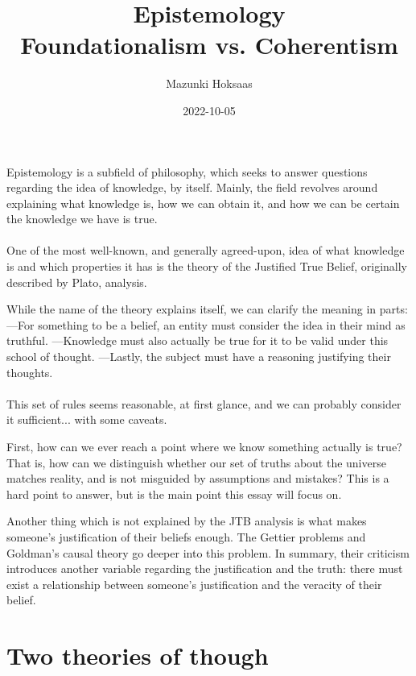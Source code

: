 \documentclass[11pt]{article}
\author{Mazunki Hoksaas}
\date{2022-10-05}
\title{Epistemology \\[1ex]\large Foundationalism vs. Coherentism}
\begin{document}
\maketitle
	\paragraph{} Epistemology is a subfield of philosophy, which seeks to answer questions regarding the idea of knowledge, by itself. Mainly, the field revolves around explaining what knowledge is, how we can obtain it, and how we can be certain the knowledge we have is true.

	\paragraph{} One of the most well-known, and generally agreed-upon, idea of what knowledge is and which properties it has is the theory of the Justified True Belief, originally described by Plato, analysis.

	While the name of the theory explains itself, we can clarify the meaning in parts: —For something to be a belief, an entity must consider the idea in their mind as truthful. —Knowledge must also actually be true for it to be valid under this school of thought. —Lastly, the subject must have a reasoning justifying their thoughts.

	\paragraph{} This set of rules seems reasonable, at first glance, and we can probably consider it sufficient... with some caveats. 

	First, how can we ever reach a point where we know something actually is true? That is, how can we distinguish whether our set of truths about the universe matches reality, and is not misguided by assumptions and mistakes? This is a hard point to answer, but is the main point this essay will focus on.

	Another thing which is not explained by the JTB analysis is what makes someone's justification of their beliefs enough. The Gettier problems and Goldman's causal theory go deeper into this problem. In summary, their criticism introduces another variable regarding the justification and the truth: there must exist a relationship between someone's justification and the veracity of their belief.

	\pagebreak{}
	\section*{Two theories of though}
\end{document}
